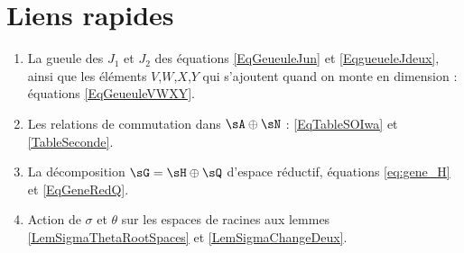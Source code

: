 %
   \section{Liens rapides}
%


\begin{enumerate}

\item 
La gueule des $J_1$ et $J_2$ des équations \eqref{EqGeueuleJun} et \eqref{EqgueueleJdeux}, ainsi que les éléments $V$,$W$,$X$,$Y$ qui s'ajoutent quand on monte en dimension : équations \eqref{EqGeueuleVWXY}.

\item
Les relations de commutation dans $\sA\oplus\sN$ : \eqref{EqTableSOIwa} et \eqref{TableSeconde}.



\item
 La décomposition $\sG=\sH\oplus\sQ$ d'espace réductif, équations \eqref{eq:gene_H} et \eqref{EqGeneRedQ}.

\item
	Action de $\sigma$ et $\theta$ sur les espaces de racines aux lemmes \ref{LemSigmaThetaRootSpaces} et \ref{LemSigmaChangeDeux}.




\end{enumerate}
